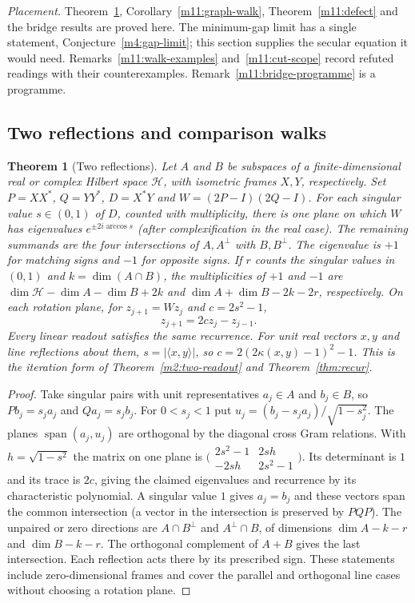 \documentclass[11pt,reqno]{amsart}
\newtheorem{theorem}{Theorem}[section]
\theoremstyle{definition}
\theoremstyle{remark}
\numberwithin{equation}{section}
\begin{document}
\emph{Placement.} Theorem~\ref{m11:reflections}, Corollary~\ref{m11:graph-walk},
Theorem~\ref{m11:defect} and the bridge results are proved here. The
minimum-gap limit has a single statement, Conjecture~\ref{m4:gap-limit}; this
section supplies the secular equation it would need.
Remarks~\ref{m11:walk-examples} and~\ref{m11:cut-scope} record refuted readings
with their counterexamples. Remark~\ref{m11:bridge-programme} is a programme.

\subsection{Two reflections and comparison walks}

\begin{theorem}[Two reflections]\label{m11:reflections}
Let $A$ and $B$ be subspaces of a finite-dimensional real or complex
Hilbert space $\mathcal H$, with isometric frames $X,Y$, respectively.
Set $P=XX^*$, $Q=YY^*$, $D=X^*Y$ and $W=(2P-I)(2Q-I)$.
For each singular value $s\in(0,1)$ of $D$, counted with multiplicity,
there is one plane on which $W$ has eigenvalues
$e^{\pm2i\arccos s}$ (after complexification in the real case).
The remaining summands are the four intersections of $A,A^\perp$
with $B,B^\perp$. The eigenvalue is $+1$ for matching signs and $-1$
for opposite signs. If $r$ counts the singular values in $(0,1)$ and
$k=\dim(A\cap B)$, the multiplicities of $+1$ and $-1$ are
$\dim\mathcal H-\dim A-\dim B+2k$ and
$\dim A+\dim B-2k-2r$, respectively.
On each rotation plane, for $z_{j+1}=Wz_j$ and $c=2s^2-1$,
\[
 z_{j+1}=2c z_j-z_{j-1}.
\]
Every linear readout satisfies the same recurrence. For unit real vectors
$x,y$ and line reflections about them, $s=|\langle x,y\rangle|$,
so $c=2(2\kappa(x,y)-1)^2-1$. This is the iteration form of
Theorem~\ref{m2:two-readout} and Theorem~\ref{thm:recur}.
\end{theorem}
\begin{proof}
Take singular pairs with unit representatives $a_j\in A$ and
$b_j\in B$, so $Pb_j=s_j a_j$ and $Qa_j=s_j b_j$. For $0<s_j<1$ put
$u_j=(b_j-s_j a_j)/\sqrt{1-s_j^2}$. The planes
$\operatorname{span}(a_j,u_j)$ are orthogonal by the diagonal cross
Gram relations. With $h=\sqrt{1-s^2}$ the matrix on one plane is
$\bigl(\begin{smallmatrix}2s^2-1&2sh\\-2sh&2s^2-1\end{smallmatrix}\bigr)$.
Its determinant is $1$ and its trace is $2c$, giving the claimed
eigenvalues and recurrence by its characteristic polynomial.
A singular value $1$ gives $a_j=b_j$ and these vectors span the common
intersection (a vector in the intersection is preserved by $PQP$).
The unpaired or zero directions are $A\cap B^\perp$ and
$A^\perp\cap B$, of dimensions $\dim A-k-r$ and $\dim B-k-r$.
The orthogonal complement of $A+B$ gives the last intersection.
Each reflection acts there by its prescribed sign. These statements
include zero-dimensional frames and cover the parallel and orthogonal
line cases without choosing a rotation plane.
\end{proof}
\end{document}
